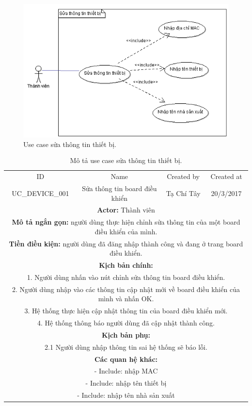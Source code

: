 \documentclass[a4paper,12pt,oneside]{article}
\begin{document}
\begin{figure}[H]	
	\centering
	\includegraphics[scale=.9]{hinh/stttb.png}
	\caption{Use case sửa thông tin thiết bị.}
\end{figure}

\begin{table}[!htp]
\centering
\begin{tabularx}{\linewidth}{ |c||c|c|c| }
\hline
ID & Name & Created by & Created at\\
UC\_DEVICE\_001 & Sửa thông tin board điều khiển & Tạ Chí Tây & 20/3/2017\\
\hline
\multicolumn{4}{|X|}{\textbf{Actor:} Thành viên }\\
\hline
\multicolumn{4}{|X|}{\textbf{Mô tả ngắn gọn:} người dùng thực hiện chỉnh sửa thông tin của một board điều khiển của mình. }\\
\hline
\multicolumn{4}{|X|}{\textbf{Tiền điều kiện:} người dùng đã đăng nhập thành công và đang ở trang board điều khiển.}\\
\hline
\multicolumn{4}{|X|}{\textbf{Kịch bản chính:}}\\
\multicolumn{4}{|X|}{1. Người dùng nhấn vào nút chỉnh sửa thông tin board điều khiển.}\\
\multicolumn{4}{|X|}{ 
2.	Người dùng nhập vào các thông tin cập nhật mới về board điều khiển của mình và nhấn OK.}\\
\multicolumn{4}{|X|}{
3.	Hệ thống thực hiện cập nhật thông tin của board điều khiển mới.}\\

\multicolumn{4}{|X|}{4. Hệ thống thông báo người dùng đã cập nhật thành công.}\\
\hline
\multicolumn{4}{|X|}{\textbf{Kịch bản phụ:}}\\
\multicolumn{4}{|X|}{2.1    Người dùng nhập thông tin sai hệ thống sẽ báo lỗi.}\\
\hline
\multicolumn{4}{|X|}{\textbf{Các quan hệ khác:}}\\
\multicolumn{4}{|X|}{- Include: nhập MAC}\\
\multicolumn{4}{|X|}{- Include: nhập tên thiết bị}\\
\multicolumn{4}{|X|}{- Include: nhập tên nhà sản xuất}\\
\hline

\end{tabularx}
\caption{Mô tả use case sửa thông tin thiết bị.}
\end{table}
\end{document}
